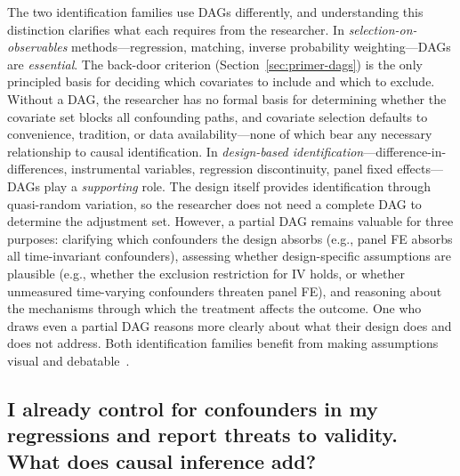 The two identification families use DAGs differently, and understanding this distinction clarifies what each requires from the researcher.
In \emph{selection-on-observables} methods---regression, matching, inverse probability weighting---DAGs are \emph{essential}.
The back-door criterion (Section~\ref{sec:primer-dags}) is the only principled basis for deciding which covariates to include and which to exclude.
Without a DAG, the researcher has no formal basis for determining whether the covariate set blocks all confounding paths, and covariate selection defaults to convenience, tradition, or data availability---none of which bear any necessary relationship to causal identification.
In \emph{design-based identification}---difference-in-differences, instrumental variables, regression discontinuity, panel fixed effects---DAGs play a \emph{supporting} role.
The design itself provides identification through quasi-random variation, so the researcher does not need a complete DAG to determine the adjustment set.
However, a partial DAG remains valuable for three purposes: clarifying which confounders the design absorbs (e.g., panel FE absorbs all time-invariant confounders), assessing whether design-specific assumptions are plausible (e.g., whether the exclusion restriction for IV holds, or whether unmeasured time-varying confounders threaten panel FE), and reasoning about the mechanisms through which the treatment affects the outcome.
One who draws even a partial DAG reasons more clearly about what their design does and does not address.
Both identification families benefit from making assumptions visual and debatable~\cite{imbens2020potential}.


\subsection{I already control for confounders in my regressions and report threats to validity. What does causal inference add?}

